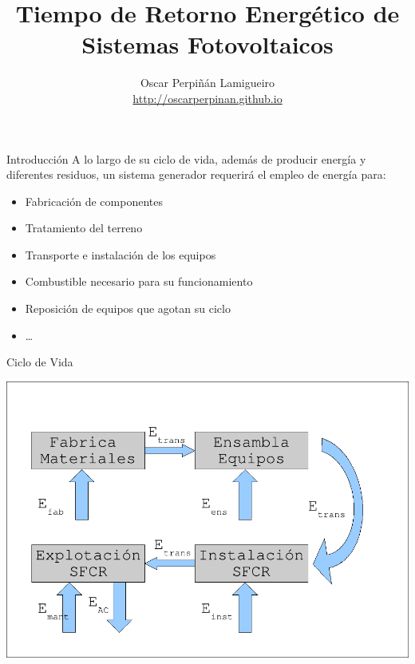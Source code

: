 \documentclass[xcolor={usenames,svgnames,dvipsnames}]{beamer}
\author{Oscar Perpiñán Lamigueiro \\ \url{http://oscarperpinan.github.io}}
\date{}
\title{Tiempo de Retorno Energético de Sistemas Fotovoltaicos}
\begin{document}
\maketitle

\begin{frame}[label={sec:org464a5c3}]{Introducción}
A lo largo de su ciclo de vida, además de producir energía y diferentes
residuos, un sistema generador requerirá el empleo de energía para:

\begin{itemize}
\item Fabricación de componentes

\item Tratamiento del terreno

\item Transporte e instalación de los equipos

\item Combustible necesario para su funcionamiento

\item Reposición de equipos que agotan su ciclo

\item \ldots{}
\end{itemize}
\end{frame}

\begin{frame}[label={sec:org4ba609d}]{Ciclo de Vida}
\begin{center}
\includegraphics[width=.9\linewidth]{../figs/LCAFlujo.pdf}
\end{center}
\end{frame}
\end{document}
